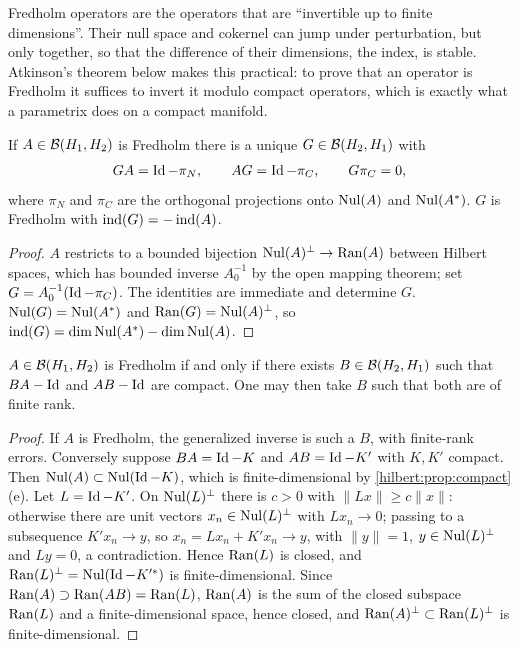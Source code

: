 \begin{discussion}
Fredholm operators are the operators that are ``invertible up to finite
dimensions''. Their null space and cokernel can jump under perturbation, but
only together, so that the difference of their dimensions, the index, is
stable. Atkinson's theorem below makes this practical: to prove that an
operator is Fredholm it suffices to invert it modulo compact operators, which
is exactly what a parametrix does on a compact manifold.
\end{discussion}

\begin{proposition}\label{hilbert:prop:generalized-inverse}
If $A\in\mathcal{B}(H_1,H_2)$ is Fredholm there is a unique $G\in\mathcal{B}(H_2,H_1)$ with
\begin{equation*}
GA=\operatorname{Id}-\pi_N,\qquad AG=\operatorname{Id}-\pi_C,\qquad G\pi_C=0,
\end{equation*}
where $\pi_N$ and $\pi_C$ are the orthogonal projections onto $\operatorname{Nul}(A)$ and $\operatorname{Nul}(A^*)$. $G$ is
Fredholm with $\operatorname{ind}(G)=-\operatorname{ind}(A)$.
\end{proposition}
\begin{proof}
$A$ restricts to a bounded bijection $\operatorname{Nul}(A)^\perp\to\operatorname{Ran}(A)$ between Hilbert spaces, which has
bounded inverse $A_0^{-1}$ by the open mapping theorem; set $G=A_0^{-1}(\operatorname{Id}-\pi_C)$. The
identities are immediate and determine $G$. $\operatorname{Nul}(G)=\operatorname{Nul}(A^*)$ and $\operatorname{Ran}(G)=\operatorname{Nul}(A)^\perp$, so
$\operatorname{ind}(G)=\dim\operatorname{Nul}(A^*)-\dim\operatorname{Nul}(A)$.
\end{proof}

\begin{theorem}[Atkinson]\label{hilbert:thm:atkinson}
$A\in\mathcal{B}(H_1,H_2)$ is Fredholm if and only if there exists $B\in\mathcal{B}(H_2,H_1)$ such that
$BA-\operatorname{Id}$ and $AB-\operatorname{Id}$ are compact. One may then take $B$ such that both are of finite rank.
\end{theorem}
\begin{proof}
If $A$ is Fredholm, the generalized inverse is such a $B$, with finite-rank errors.
Conversely suppose $BA=\operatorname{Id}-K$ and $AB=\operatorname{Id}-K'$ with $K,K'$ compact. Then
$\operatorname{Nul}(A)\subset\operatorname{Nul}(\operatorname{Id}-K)$, which is finite-dimensional by \cref{hilbert:prop:compact}(e).
Let $L=\operatorname{Id}-K'$. On $\operatorname{Nul}(L)^\perp$ there is $c>0$ with $\|Lx\|\ge c\|x\|$: otherwise there are unit
vectors $x_n\in\operatorname{Nul}(L)^\perp$ with $Lx_n\to0$; passing to a subsequence $K'x_n\to y$, so
$x_n=Lx_n+K'x_n\to y$, with $\|y\|=1$, $y\in\operatorname{Nul}(L)^\perp$ and $Ly=0$, a contradiction. Hence
$\operatorname{Ran}(L)$ is closed, and $\operatorname{Ran}(L)^\perp=\operatorname{Nul}(\operatorname{Id}-K'^*)$ is finite-dimensional. Since
$\operatorname{Ran}(A)\supset\operatorname{Ran}(AB)=\operatorname{Ran}(L)$, $\operatorname{Ran}(A)$ is the sum of the closed subspace $\operatorname{Ran}(L)$ and a
finite-dimensional space, hence closed, and $\operatorname{Ran}(A)^\perp\subset\operatorname{Ran}(L)^\perp$ is
finite-dimensional.
\end{proof}

